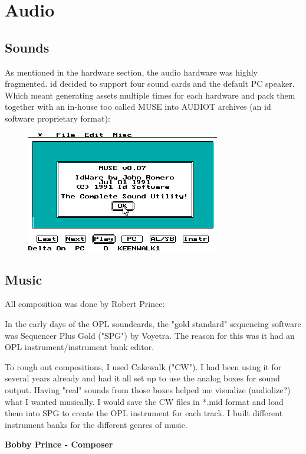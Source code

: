\documentclass[book.tex]{subfiles}
\begin{document}
\section{Audio}

\subsection{Sounds}
As mentioned in the hardware section, the audio hardware was highly fragmented. id decided to support four sound cards and the default PC speaker. Which meant generating assets multiple times for each hardware and pack them together with an in-house too called MUSE into AUDIOT archives (an id software proprietary format):\\
\begin{figure}[H]
\centering
 \includegraphics[width=\textwidth]{screenshots/muse.png}
 \end{figure}
 \par

\subsection{Music}
All composition was done by Robert Prince:\\
\par
 \begin{fancyquotes}
In the early days of the OPL soundcards, the "gold standard" sequencing software was Sequencer Plus Gold ("SPG") by Voyetra. The reason for this was it had an OPL instrument/instrument bank editor.\\
\par
To rough out compositions, I used Cakewalk ("CW"). I had been using it for several years already and had it all set up to use the analog boxes for sound output. Having "real" sounds from those boxes helped me visualize (audiolize?) what I wanted musically. I would save the CW files in *.mid format and load them into SPG to create the OPL instrument for each track. I built different instrument banks for the different genres of music.

\textbf{Bobby Prince - Composer}
 \end{fancyquotes}\\
\end{document}
